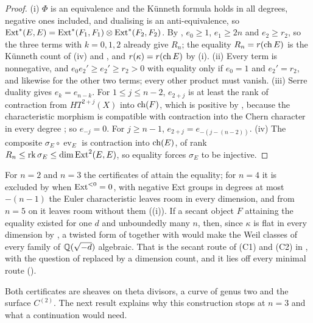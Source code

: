 \begin{proof}
(i) $\Phi$ is an equivalence and the K\"unneth formula holds in all degrees,
negative ones included, and dualising is an anti-equivalence, so
$\operatorname{Ext}^{*}(E,E)=\operatorname{Ext}^{*}(F_{1},F_{1})\otimes\operatorname{Ext}^{*}(F_{2},F_{2})$. By
, $e_{0}\ge1$, $e_{1}\ge2n$ and $e_{2}\ge r_{2}$, so the
three terms with $k=0,1,2$ already give $R_{n}$; the equality $R_{n}=r(\operatorname{ch} E)$ is
the K\"unneth count of (iv) and , and
$r(\kappa)=r(\operatorname{ch} E)$ by (i). (ii) Every term is nonnegative,
and $e_{0}e_{2}'\ge e_{2}'\ge r_{2}>0$ with equality only if $e_{0}=1$ and
$e_{2}'=r_{2}$, and likewise for the other two terms; every other product must
vanish. (iii) Serre duality gives $e_{k}=e_{n-k}$. For $1\le j\le n-2$, $e_{2+j}$ is
at least the rank of contraction from $HT^{2+j}(X)$ into $\operatorname{ch}(F)$, which is
positive by , because the characteristic morphism is
compatible with contraction into the Chern character in every degree
\cite{CRV12}; so $e_{-j}=0$. For $j\ge n-1$, $e_{2+j}=e_{-(j-(n-2))}$.
(iv) The composite $\sigma_{E}\circ\operatorname{ev}_{E}$
is contraction into $\operatorname{ch}(E)$, of rank $R_{n}\le\operatorname{rk}\sigma_{E}\le
\dim\operatorname{Ext}^{2}(E,E)$, so equality forces $\sigma_{E}$ to be injective.
\end{proof}

For $n=2$ and $n=3$ the certificates of  attain the
equality; for $n=4$ it is excluded by  when
$\operatorname{Ext}^{<0}=0$, with negative Ext groups in degrees at most $-(n-1)$ the
Euler characteristic leaves room in every dimension, and from $n=5$ on it
leaves room without them ((i)). If a secant object $F$
attaining the equality existed for one $d$ and unboundedly many $n$, then,
since $\kappa$ is flat in every dimension by
, a twisted form of  together with
\cite[Proposition~2.13]{paperIII} would make the Weil classes of every family of
$\mathbb{Q}(\sqrt{-d})$ algebraic. That is the secant route of (C1) and (C2) in
\cite[Section~2.5]{paperIII}, with the question of \cite{Mar25b} replaced by a
dimension count, and it lies off every minimal route (\cite[Theorem~2.70(iv)]{paperIII}).

Both certificates are sheaves on theta divisors, a curve of genus two and the
surface $C^{(2)}$. The next result explains why this construction stops at
$n=3$ and what a continuation would need.

